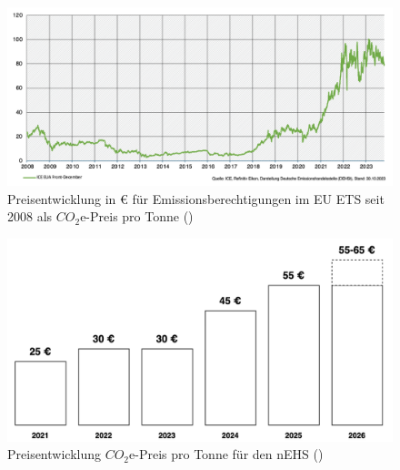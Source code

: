 \begin{figure}[ht]
	\centering
	\includegraphics[width=1.0\textwidth]{Bilder/price_co2_eu_ets.png} 
	\caption{Preisentwicklung in € für Emissionsberechtigungen im EU ETS seit 2008 als $CO_2$e-Preis pro Tonne (\cite{dehst.2023})}
	\label{fig:price_co2_eu_ets}
\end{figure}

\begin{figure}[ht]
	\centering
	\includegraphics[width=1.0\textwidth]{Bilder/prices_nehs.png} 
	\caption{Preisentwicklung $CO_2$e-Preis pro Tonne für den nEHS (\cite{dehst.2023})}
	\label{fig:prices_nehs}
\end{figure}